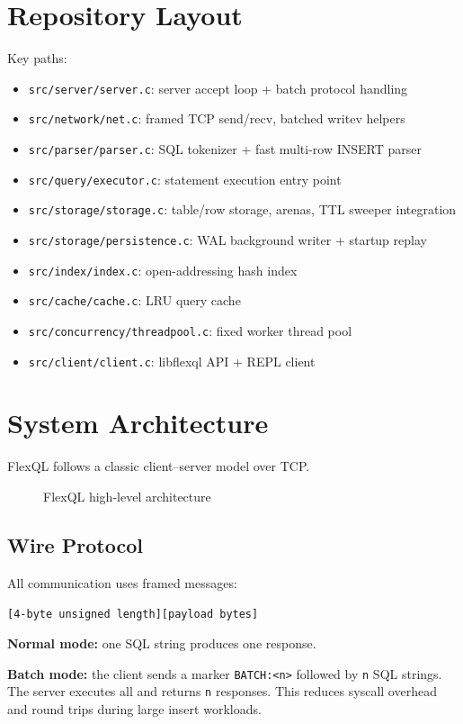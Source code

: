 \documentclass[11pt,a4paper]{article}
\begin{document}
\section{Repository Layout}
Key paths:
\begin{itemize}
  \item \texttt{src/server/server.c}: server accept loop + batch protocol handling
  \item \texttt{src/network/net.c}: framed TCP send/recv, batched writev helpers
  \item \texttt{src/parser/parser.c}: SQL tokenizer + fast multi-row INSERT parser
  \item \texttt{src/query/executor.c}: statement execution entry point
  \item \texttt{src/storage/storage.c}: table/row storage, arenas, TTL sweeper integration
  \item \texttt{src/storage/persistence.c}: WAL background writer + startup replay
  \item \texttt{src/index/index.c}: open-addressing hash index
  \item \texttt{src/cache/cache.c}: LRU query cache
  \item \texttt{src/concurrency/threadpool.c}: fixed worker thread pool
  \item \texttt{src/client/client.c}: libflexql API + REPL client
\end{itemize}

\section{System Architecture}
FlexQL follows a classic client--server model over TCP.

\begin{figure}[H]
\centering

\caption{FlexQL high-level architecture}
\end{figure}

\subsection{Wire Protocol}
All communication uses framed messages:
\begin{center}
\texttt{[4-byte unsigned length][payload bytes]}
\end{center}

\textbf{Normal mode:} one SQL string produces one response.

\textbf{Batch mode:} the client sends a marker \texttt{BATCH:<n>} followed by \texttt{n} SQL strings. The server executes all and returns \texttt{n} responses. This reduces syscall overhead and round trips during large insert workloads.
\end{document}
